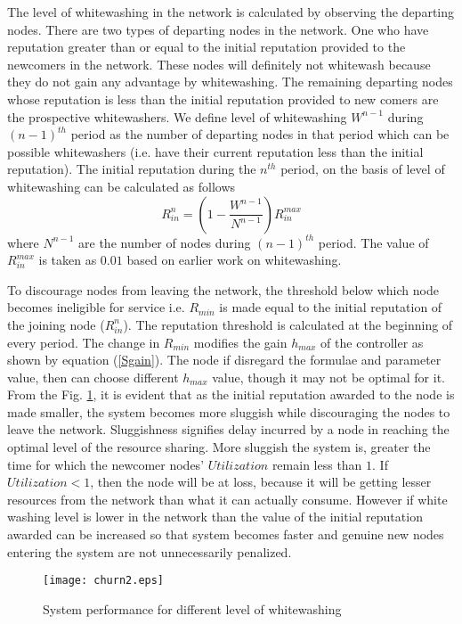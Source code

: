 \documentclass[journal]{IEEEtran}
\begin{document}
The level of whitewashing in the network is calculated by observing the departing nodes. There are two types of departing nodes in the network. One who have reputation greater than or equal to the initial reputation provided to the newcomers in the network. These nodes will definitely not whitewash because they do not gain any advantage by whitewashing. The remaining departing nodes whose reputation is less than the initial reputation provided to new comers are the prospective whitewashers. We define level of whitewashing $W^{n-1}$ during $(n-1)^{th}$ period as the number of departing nodes in that period which can be possible whitewashers (i.e. have their current reputation less than the initial reputation). 
The initial reputation during the $n^{th}$ period, on the basis of level of whitewashing can be calculated as follows
\begin{equation}
	\label{whitewash}
	{R_{in}^n}=\left(1-\frac{W^{n-1}}{N^{n-1}}\right){R_{in}^{max}}
\end{equation}
where $N^{n-1}$ are the number of nodes during $(n-1)^{th}$ period. The value of $R_{in}^{max}$ is taken as $0.01$ based on earlier work \cite{Satsiou} on whitewashing.

To discourage nodes from leaving the network, the threshold below which node becomes ineligible for service i.e. $R_{min}$ is made equal to the initial reputation of the joining node (${R_{in}^n}$).  The reputation threshold is calculated at the beginning of every period. The change in $R_{min}$ modifies the gain $h_{max}$ of the controller as shown by equation (\ref{Sgain}). The node if disregard the formulae and parameter value, then can choose different $h_{max}$ value, though it may not be optimal for it. From the Fig. \ref{whitewashing}, it is evident that as the initial reputation awarded to the node is made smaller, the system becomes more sluggish while discouraging the nodes to leave the network. Sluggishness signifies delay incurred by a node in reaching the optimal level of the resource sharing. More sluggish the system is, greater the time for which the newcomer nodes' $Utilization$ remain less than $1$. If $Utilization <1$, then the node will be at loss, because it will be getting  lesser resources from the network than what it can actually consume. However if white washing level is lower in the network than the value of the initial reputation awarded can be increased so that system becomes faster and genuine new nodes entering the system are not unnecessarily penalized. 
\begin{figure}[!t]
	\begin{center}
		\texttt{[image: churn2.eps]}
		\caption{System performance for different level of whitewashing }
		\label{whitewashing}
	\end{center}
\end{figure}  
\end{document}
